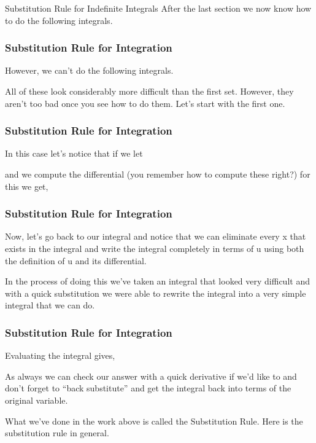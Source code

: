 \documentclass{beamer}
\begin{document}
	\begin{frame}
		Substitution Rule for Indefinite Integrals
After the last section we now know how to do the following integrals.
\end{frame}
\begin{frame}
	\frametitle{Substitution Rule for Integration}
	\large
	
 
 
However, we can’t do the following integrals.

 
 
All of these look considerably more difficult than the first set.  However, they aren’t too bad once you see how to do them.  Let’s start with the first one.


\end{frame}
\begin{frame}
	\frametitle{Substitution Rule for Integration}
	\large
	
 
In this case let’s notice that if we let

 
and we compute the differential (you remember how to compute these right?) for this we get,
 

 
\end{frame}
\begin{frame}
	\frametitle{Substitution Rule for Integration}
	\large
	
Now, let’s go back to our integral and notice that we can eliminate every x that exists in the integral and write the integral completely in terms of u using both the definition of u and its differential.

 
 
In the process of doing this we’ve taken an integral that looked very difficult and with a quick substitution we were able to rewrite the integral into a very simple integral that we can do.
 
\end{frame}
\begin{frame}
	\frametitle{Substitution Rule for Integration}
	\large
	
Evaluating the integral gives,

 
 
As always we can check our answer with a quick derivative if we’d like to and don’t forget to “back substitute” and get the integral back into terms of the original variable.
 
What we’ve done in the work above is called the Substitution Rule.  Here is the substitution rule in general.
 
\end{frame}
\end{document}
